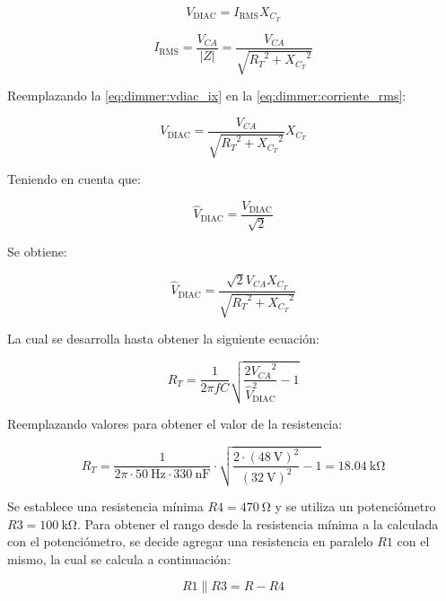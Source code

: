 \begin{equation} \label{eq:dimmer:corriente_rms}
V_{\text{DIAC}} = I_{\text{RMS}} X_{C_T}
\end{equation}

\begin{equation} \label{eq:dimmer:vdiac_ix}
I_{\text{RMS}} = \frac{V_{CA}}{|Z|} = \frac{V_{CA}}{\sqrt{{R_T}^2 + {X_{C_T}}^2}}
\end{equation}

Reemplazando la \cref{eq:dimmer:vdiac_ix} en la \cref{eq:dimmer:corriente_rms}:

\begin{equation}
V_{\text{DIAC}} = \frac{V_{CA}}{\sqrt{{R_T}^2 + {X_{C_T}}^2}} X_{C_T}
\end{equation}

Teniendo en cuenta que:

\begin{equation}
\hat{V}_{\text{DIAC}} = \frac{V_{\text{DIAC}}}{\sqrt{2}}
\end{equation}

Se obtiene:

\begin{equation}
\hat{V}_{\text{DIAC}} = \frac{\sqrt{2} V_{CA} X_{C_T}}{\sqrt{{R_T}^2 + {X_{C_T}}^2}}
\end{equation}

La cual se desarrolla hasta obtener la siguiente ecuación:

\begin{equation}
{R_T} = \frac{1}{2 \pi f C} \sqrt{ \frac{2 {V_{CA}}^2}{\hat{V}_{\text{DIAC}}^2} - 1}
\end{equation}

Reemplazando valores para obtener el valor de la resistencia:

\begin{equation}
{R_T} = \frac{1}{2 \pi \cdot \SI{50}{\hertz} \cdot \SI{330}{\nano\farad}} \cdot \sqrt{\frac{2 \cdot (\SI{48}{\volt})^2}{(\SI{32}{\volt})^2} - 1} = \SI{18.04}{\kilo\ohm}
\end{equation}

Se establece una resistencia mínima $R4 = \SI{470}{\ohm}$ y se utiliza un potenciómetro $R3 = \SI{100}{\kilo\ohm}$. Para obtener el rango desde la resistencia mínima a la calculada con el potenciómetro, se decide agregar una resistencia en paralelo $R1$ con el mismo, la cual se calcula a continuación:

\begin{equation}
R1 \parallel R3 = R - R4
\end{equation}

